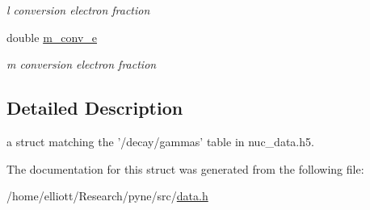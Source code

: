 \begin{DoxyCompactItemize}
\begin{DoxyCompactList}\small\item\em l conversion electron fraction \end{DoxyCompactList}\item 
\hypertarget{structpyne_1_1gamma_a6c664717050818947e2e79d75e914c41}{double \hyperlink{structpyne_1_1gamma_a6c664717050818947e2e79d75e914c41}{m\-\_\-conv\-\_\-e}}\label{structpyne_1_1gamma_a6c664717050818947e2e79d75e914c41}

\begin{DoxyCompactList}\small\item\em m conversion electron fraction \end{DoxyCompactList}\end{DoxyCompactItemize}


\subsection{Detailed Description}
a struct matching the '/decay/gammas' table in nuc\-\_\-data.\-h5. 

The documentation for this struct was generated from the following file\-:\begin{DoxyCompactItemize}
\item 
/home/elliott/\-Research/pyne/src/\hyperlink{data_8h}{data.\-h}\end{DoxyCompactItemize}
